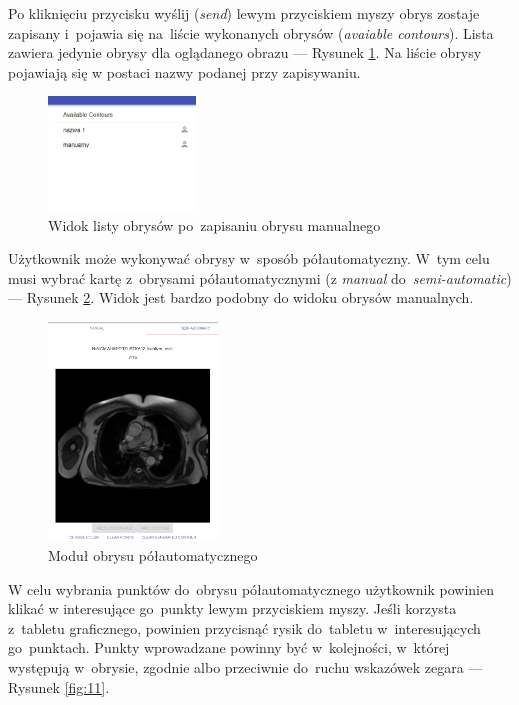 \documentclass[a4paper,11pt,twoside,openright]{report}
\theoremstyle{definition}
\begin{document}
Po kliknięciu przycisku wyślij (\textit{send}) lewym przyciskiem myszy obrys zostaje
zapisany i~pojawia się na~liście wykonanych obrysów (\textit{avaiable contours}). Lista
zawiera jedynie obrysy dla oglądanego obrazu --- Rysunek \ref{fig:9}. Na liście
obrysy pojawiają się w postaci nazwy podanej przy zapisywaniu.

\begin{figure}[h!]
	\center
	\includegraphics[width=0.35\textwidth]{9}
	\caption{Widok listy obrysów po~zapisaniu obrysu manualnego}
    	\label{fig:9}
\end{figure}

Użytkownik może wykonywać obrysy w~sposób półautomatyczny. W~tym celu musi
wybrać kartę z~obrysami półautomatycznymi (z \textit{manual} do~\textit{semi-automatic}) ---
Rysunek \ref{fig:10}. Widok jest bardzo podobny do widoku obrysów manualnych.

\pagebreak

\begin{figure}[h!]
	\center
	\includegraphics[width=0.4\textwidth]{10}
	\caption{Moduł obrysu półautomatycznego}
    	\label{fig:10}
\end{figure}

W celu wybrania punktów do~obrysu półautomatycznego użytkownik powinien klikać w
interesujące go~punkty lewym przyciskiem myszy. Jeśli korzysta z~tabletu
graficznego, powinien przycisnąć rysik do~tabletu w~interesujących go~punktach.
Punkty wprowadzane powinny być w~kolejności, w~której występują w~obrysie,
zgodnie albo przeciwnie do~ruchu wskazówek zegara --- Rysunek \ref{fig:11}.
\end{document}
